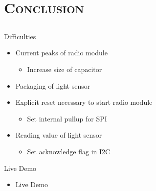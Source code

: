 	
	\section{\scshape Conclusion}
	\subsection{}
	\begin{frame}{Difficulties}
		\begin{itemize}
			\item Current peaks of radio module
			\begin{itemize}
				\item Increase size of capacitor
			\end{itemize}
			\item Packaging of light sensor
			\item Explicit reset necessary to start radio module
			\begin{itemize}
				\item Set internal pullup for SPI
			\end{itemize}
			\item Reading value of light sensor
			\begin{itemize}
				\item Set acknowledge flag in I2C
			\end{itemize}
		\end{itemize}
	\end{frame}

	\begin{frame}{Live Demo}
		\begin{itemize}
			\item Live Demo
		\end{itemize}
	\end{frame}	
	
